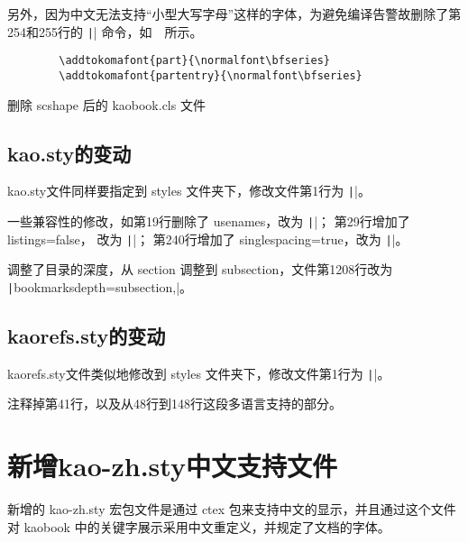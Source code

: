 另外，因为中文无法支持“小型大写字母”这样的字体，为避免编译告警故删除了第254和255行的 \texttt|\scshape| 命令，如~~所示。

\begin{listing}[H]
    \begin{verbatim}
        \addtokomafont{part}{\normalfont\bfseries}
        \addtokomafont{partentry}{\normalfont\bfseries}
    \end{verbatim}
    \caption{删除 scshape 后的 kaobook.cls‌ 文件}
\end{listing}

\subsection{kao.sty的变动}
kao.sty文件同样要指定到 styles 文件夹下，修改文件第1行为 \texttt||。

一些兼容性的修改，如第19行删除了 usenames，改为 \newline \texttt||； \newline 第29行增加了 listings=false， 改为 \newline \texttt|\AtEndPreamble{\RequirePackage[listings=false]{scrhack}}|； 第240行增加了 singlespacing=true，改为 \newline \texttt|\RequirePackage[singlespacing=true]{scrlayer-scrpage}|。

调整了目录的深度，从 section 调整到 subsection，文件第1208行改为 \texttt|bookmarksdepth=subsection,|。

\subsection{kaorefs.sty的变动}
kaorefs.sty文件类似地修改到 styles 文件夹下，修改文件第1行为 \texttt||。

注释掉第41行，以及从48行到148行这段多语言支持的部分。

\section[kao-zh.sty中文支持]{新增kao-zh.sty中文支持文件}

新增的 kao-zh.sty 宏包文件是通过 ctex 包来支持中文的显示，并且通过这个文件对 kaobook 中的关键字展示采用中文重定义，并规定了文档的字体。

